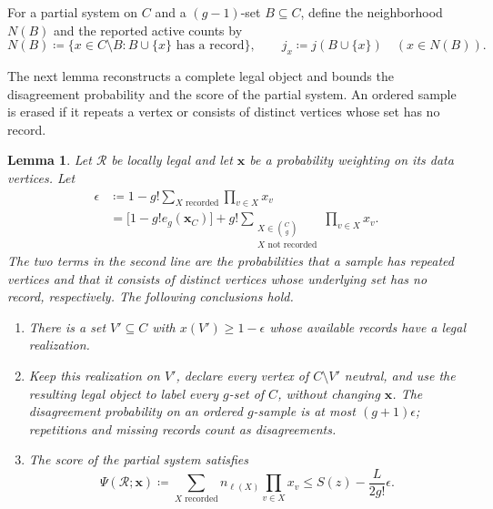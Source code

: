\documentclass[10pt]{article}
\numberwithin{equation}{section}
\newtheorem{lemma}[lemma]{Lemma}\aliascntresetthe{lemma}
\theoremstyle{definition}
\newcommand{\x}{\boldsymbol{x}}\newcommand{\y}{\boldsymbol{y}}
\begin{document}
For a partial system on $C$ and a $(g-1)$-set $B\subseteq C$, define the neighborhood $N(B)$ and the reported active counts by
\[
 N(B)\coloneqq\{x\in C\setminus B\colon B\cup\{x\}\text{ has a record}\},
 \qquad j_x\coloneqq j(B\cup\{x\})\quad(x\in N(B)).
\]
\begin{samepage}
The next lemma reconstructs a complete legal object and bounds the disagreement probability and the score of the partial system. An ordered sample is erased if it repeats a vertex or consists of distinct vertices whose set has no record.

\begin{lemma}\label{lem:recordrepair}\label{prop:recordpenalty}
Let $\mathcal R$ be locally legal and let $\x$ be a probability weighting on its data vertices. Let
\begin{equation}\label{eq:erasure}
 \begin{aligned}
 \epsilon&\coloneqq1-g!\sum_{X\text{ recorded}}\prod_{v\in X}x_v\\
 &=\bigl[1-g!e_g(\x_C)\bigr]
   +g!\sum_{\substack{X\in\binom Cg\\X\text{ not recorded}}}\prod_{v\in X}x_v.
 \end{aligned}
\end{equation}
The two terms in the second line are the probabilities that a sample has repeated vertices and that it consists of distinct vertices whose underlying set has no record, respectively. The following conclusions hold.
\begin{enumerate}
\item There is a set $V'\subseteq C$ with $x(V')\ge1-\epsilon$ whose available records have a legal realization.
\item Keep this realization on $V'$, declare every vertex of $C\setminus V'$ neutral, and use the resulting legal object to label every $g$-set of $C$, without changing $\x$. The disagreement probability on an ordered $g$-sample is at most $(g+1)\epsilon$; repetitions and missing records count as disagreements.
\item The score of the partial system satisfies
\begin{equation}\label{eq:recordpenalty}
 \Psi(\mathcal R;\x)\coloneqq\sum_{X\text{ recorded}}n_{\ell(X)}\prod_{v\in X}x_v
 \le S(z)-\frac{L}{2g!}\epsilon.
\end{equation}
\end{enumerate}
\end{lemma}
\end{samepage}
\end{document}
